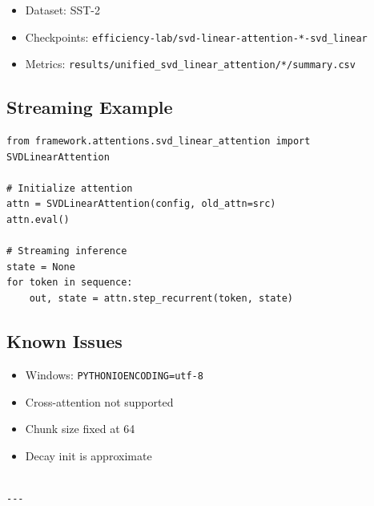\begin{itemize}
\item Dataset: SST-2
\item Checkpoints: \texttt{efficiency-lab/svd-linear-attention-*-svd\_linear}
\item Metrics: \texttt{results/unified\_svd\_linear\_attention/*/summary.csv}

\end{itemize}
\subsection{Streaming Example}

\begin{lstlisting}
from framework.attentions.svd_linear_attention import SVDLinearAttention

# Initialize attention
attn = SVDLinearAttention(config, old_attn=src)
attn.eval()

# Streaming inference
state = None
for token in sequence:
    out, state = attn.step_recurrent(token, state)
\end{lstlisting}

\subsection{Known Issues}

\begin{itemize}
\item Windows: \texttt{PYTHONIOENCODING=utf-8}
\item Cross-attention not supported
\item Chunk size fixed at 64
\item Decay init is approximate
\end{itemize}
\begin{lstlisting}

---
\end{lstlisting}